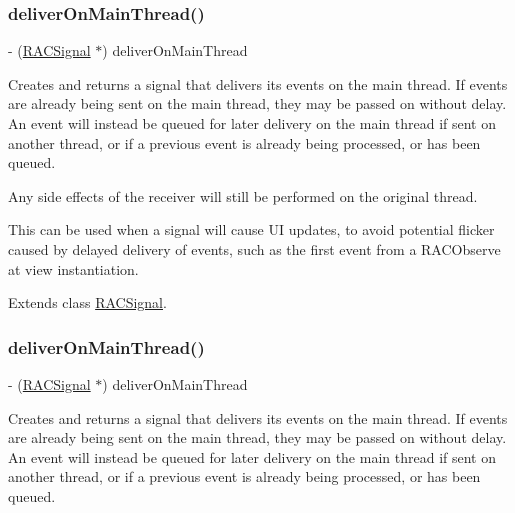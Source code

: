 \subsubsection{\texorpdfstring{deliver\+On\+Main\+Thread()}{deliverOnMainThread()}\hspace{0.1cm}{\footnotesize\ttfamily [2/3]}}
{\footnotesize\ttfamily -\/ (\mbox{\hyperlink{interface_r_a_c_signal}{R\+A\+C\+Signal}} $\ast$) deliver\+On\+Main\+Thread \begin{DoxyParamCaption}{ }\end{DoxyParamCaption}}

Creates and returns a signal that delivers its events on the main thread. If events are already being sent on the main thread, they may be passed on without delay. An event will instead be queued for later delivery on the main thread if sent on another thread, or if a previous event is already being processed, or has been queued.

Any side effects of the receiver will still be performed on the original thread.

This can be used when a signal will cause UI updates, to avoid potential flicker caused by delayed delivery of events, such as the first event from a R\+A\+C\+Observe at view instantiation. 

Extends class \mbox{\hyperlink{interface_r_a_c_signal_a0c7042ce0eb6c729bc38421295296db1}{R\+A\+C\+Signal}}.

\mbox{\label{category_r_a_c_signal_07_operations_08_a0c7042ce0eb6c729bc38421295296db1}} 
\subsubsection{\texorpdfstring{deliver\+On\+Main\+Thread()}{deliverOnMainThread()}\hspace{0.1cm}{\footnotesize\ttfamily [3/3]}}
{\footnotesize\ttfamily -\/ (\mbox{\hyperlink{interface_r_a_c_signal}{R\+A\+C\+Signal}} $\ast$) deliver\+On\+Main\+Thread \begin{DoxyParamCaption}{ }\end{DoxyParamCaption}}

Creates and returns a signal that delivers its events on the main thread. If events are already being sent on the main thread, they may be passed on without delay. An event will instead be queued for later delivery on the main thread if sent on another thread, or if a previous event is already being processed, or has been queued.

